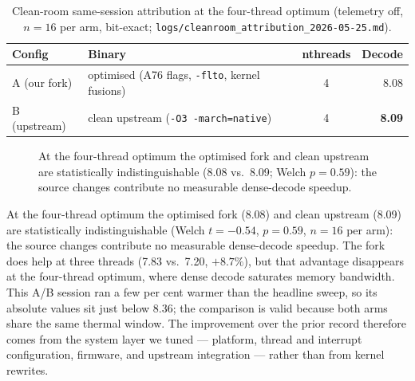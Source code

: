 \documentclass[10pt,a4paper]{article}
\begin{document}
\begin{table}[H]
\centering\small
\caption{Clean-room same-session attribution at the four-thread optimum (telemetry off, $n{=}16$ per arm, bit-exact; \texttt{logs/cleanroom\_attribution\_2026-05-25.md}).}
\label{tab:attr}
\begin{tabularx}{\textwidth}{@{}lXcr@{}}
\toprule
\textbf{Config} & \textbf{Binary} & \textbf{nthreads} & \textbf{Decode} \\
\midrule
A (our fork) & optimised (A76 flags, \texttt{-flto}, kernel fusions) & 4 & 8.08 \\
B (upstream) & clean upstream (\texttt{-O3 -march=native}) & 4 & \textbf{8.09} \\
\bottomrule
\end{tabularx}
\end{table}

\begin{figure}[H]
\centering
{}
\caption{At the four-thread optimum the optimised fork and clean upstream are statistically indistinguishable (8.08 vs.\ 8.09; Welch $p=0.59$): the source changes contribute no measurable dense-decode speedup.}
\label{fig:attr}
\end{figure}

At the four-thread optimum the optimised fork (8.08) and clean upstream (8.09) are statistically indistinguishable (Welch $t={-}0.54$, $p=0.59$, $n{=}16$ per arm): the source changes contribute no measurable dense-decode speedup. The fork does help at three threads (7.83 vs.\ 7.20, $+8.7\%$), but that advantage disappears at the four-thread optimum, where dense decode saturates memory bandwidth. This A/B session ran a few per cent warmer than the headline sweep, so its absolute values sit just below 8.36; the comparison is valid because both arms share the same thermal window. The improvement over the prior record therefore comes from the system layer we tuned --- platform, thread and interrupt configuration, firmware, and upstream integration --- rather than from kernel rewrites.
\end{document}
